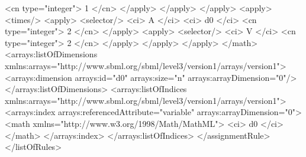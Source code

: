 \begin{example}
                            <cn type="integer"> 1 </cn>
                        </apply>
                    </apply>
                </apply>
                <apply>
                    <times/>
                    <apply>
                        <selector/>
                        <ci> A </ci>
                        <ci> d0 </ci>
                        <cn type="integer"> 2 </cn>
                    </apply>
                    <apply>
                        <selector/>
                        <ci> V </ci>
                        <cn type="integer"> 2 </cn>
                    </apply>
                </apply>
            </apply>
        </math>
        <arrays:listOfDimensions
            xmlns:arrays="http://www.sbml.org/sbml/level3/version1/arrays/version1">
            <arrays:dimension arrays:id="d0" arrays:size="n" arrays:arrayDimension="0"/>
        </arrays:listOfDimensions>
        <arrays:listOfIndices
            xmlns:arrays="http://www.sbml.org/sbml/level3/version1/arrays/version1">
            <arrays:index arrays:referencedAttribute="variable" arrays:arrayDimension="0">
                <math xmlns="http://www.w3.org/1998/Math/MathML">
                    <ci> d0 </ci>
                </math>
            </arrays:index>
        </arrays:listOfIndices>
    </assignmentRule>
</listOfRules>
\end{example}





